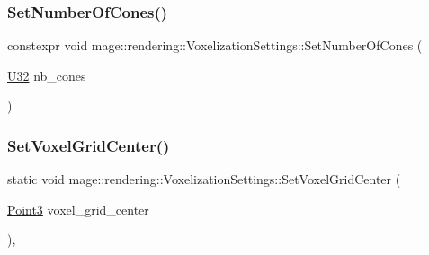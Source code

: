 \hypertarget{classmage_1_1rendering_1_1_voxelization_settings_ac7b2ca30bb73b5fb7e0c2cc46001ae22}{}\label{classmage_1_1rendering_1_1_voxelization_settings_ac7b2ca30bb73b5fb7e0c2cc46001ae22} 
\subsubsection{\texorpdfstring{Set\+Number\+Of\+Cones()}{SetNumberOfCones()}}
{\footnotesize\ttfamily constexpr void mage\+::rendering\+::\+Voxelization\+Settings\+::\+Set\+Number\+Of\+Cones (\begin{DoxyParamCaption}\item[{\hyperlink{namespacemage_a41c104c036fba3756a74e19f793eeaa1}{U32}}]{nb\+\_\+cones }\end{DoxyParamCaption})\hspace{0.3cm}{\ttfamily [noexcept]}}

\hypertarget{classmage_1_1rendering_1_1_voxelization_settings_ad4a2dd741cdd4187eaaa2492fb1ca533}{}\label{classmage_1_1rendering_1_1_voxelization_settings_ad4a2dd741cdd4187eaaa2492fb1ca533} 
\subsubsection{\texorpdfstring{Set\+Voxel\+Grid\+Center()}{SetVoxelGridCenter()}}
{\footnotesize\ttfamily static void mage\+::rendering\+::\+Voxelization\+Settings\+::\+Set\+Voxel\+Grid\+Center (\begin{DoxyParamCaption}\item[{\hyperlink{structmage_1_1_point3}{Point3}}]{voxel\+\_\+grid\+\_\+center }\end{DoxyParamCaption})\hspace{0.3cm}{\ttfamily [static]}, {\ttfamily [noexcept]}}

\hypertarget{classmage_1_1rendering_1_1_voxelization_settings_aeffbe093b1df8a738906db2249961ed8}{}\label{classmage_1_1rendering_1_1_voxelization_settings_aeffbe093b1df8a738906db2249961ed8} 

